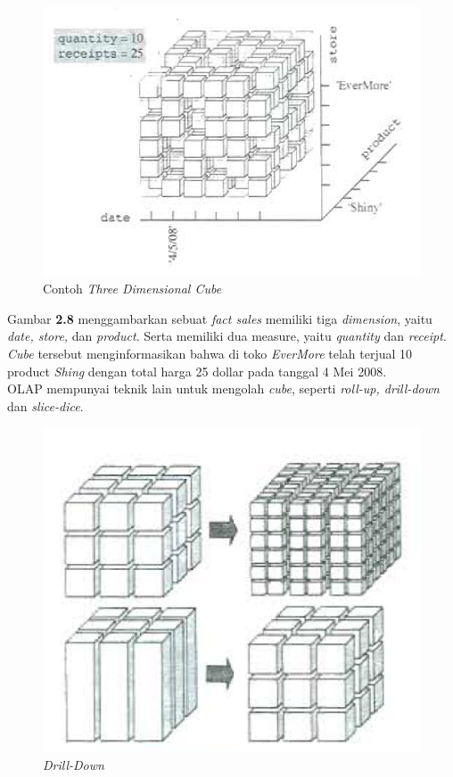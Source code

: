 \begin{figure}[h]
	\centering
	\includegraphics[scale=0.85]{Gambar/contoh-cube}
	\caption{Contoh \textit{Three Dimensional Cube}\cite{Matteo:2009}}
	\end{figure} 

Gambar \textbf{2.8} menggambarkan sebuat \textit{fact sales} memiliki tiga \textit{dimension}, yaitu \textit{date, store, }dan \textit{product}. Serta memiliki dua measure, yaitu \textit{quantity} dan \textit{receipt}. \textit{Cube} tersebut menginformasikan bahwa di toko \textit{EverMore} telah terjual 10 product \textit{Shing} dengan total harga 25 dollar pada tanggal 4 Mei 2008.\cite{Matteo:2009} \\
OLAP mempunyai teknik lain untuk mengolah \textit{cube}, seperti \textit{roll-up, drill-down} dan \textit{slice-dice}.

\begin{figure}[h]
	\centering
	\includegraphics[scale=0.85]{Gambar/drill-down}
	\caption{\textit{Drill-Down}\cite{Matteo:2009}}
	\end{figure} 

